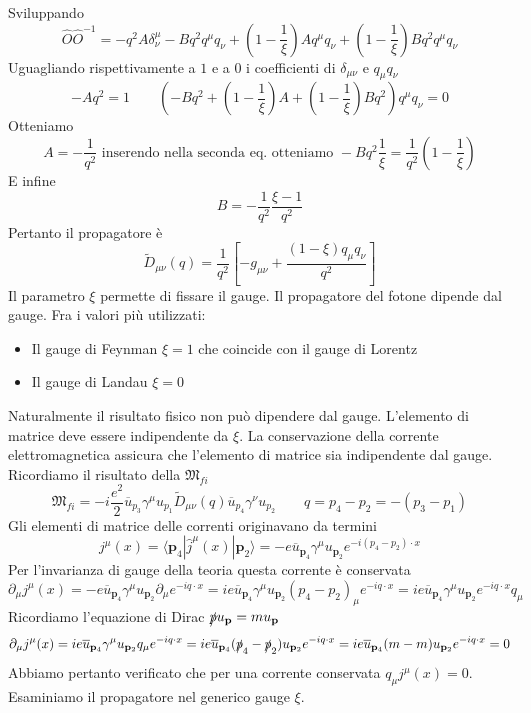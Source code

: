 Sviluppando
$$
\hat{O} \hat{O}^{-1} = -q^2 A \delta^\mu_\nu - B q^2 q^\mu q_\nu + \left( 1 - \frac{1}{\xi} \right) A q^\mu q_\nu + \left( 1 - \frac{1}{\xi} \right) B q^2 q^\mu q_\nu
$$
Uguagliando rispettivamente a $1$ e a $0$ i coefficienti di $\delta_{\mu\nu}$ e $q_\mu q_\nu$
$$
-A q^2 = 1 \qquad \left( -B q^2 + \left( 1 - \frac{1}{\xi} \right) A + \left( 1 - \frac{1}{\xi} \right) B q^2 \right) q^\mu q_\nu = 0
$$
Otteniamo
$$
A = -\frac{1}{q^2} \text{ inserendo nella seconda eq. otteniamo }-B q^2 \frac{1}{\xi} = \frac{1}{q^2} \left( 1 - \frac{1}{\xi} \right)
$$
E infine
$$
B = - \frac{1}{q^2} \frac{\xi - 1}{q^2}
$$
Pertanto il propagatore è
$$
\tilde{D}_{\mu\nu}(q) = \frac{1}{q^2} \left[ -g_{\mu\nu} + \frac{(1 - \xi) q_\mu q_\nu}{q^2} \right]
$$
Il parametro $\xi$ permette di fissare il gauge. Il propagatore del fotone dipende dal gauge. Fra i valori più utilizzati:
\begin{itemize}
    \item Il gauge di Feynman $\xi=1$ che coincide con il gauge di Lorentz
    \item Il gauge di Landau $\xi=0$
\end{itemize}
Naturalmente il risultato fisico non può dipendere dal gauge. L'elemento di matrice deve essere indipendente da $\xi$. La conservazione della corrente elettromagnetica assicura che l'elemento di matrice sia indipendente dal gauge. Ricordiamo il risultato della $\mathfrak{M}_{fi}$
$$
\mathfrak{M}_{fi} = -i \frac{e^2}{2} \overline{u}_{p_3} \gamma^\mu u_{p_1} \tilde{D}_{\mu\nu}(q) \overline{u}_{p_4} \gamma^\nu u_{p_2} \qquad q = p_4 - p_2 = -(p_3 - p_1)
$$
Gli elementi di matrice delle correnti originavano da termini
$$
j^\mu(x) = \langle \mathbf{p}_4 | \hat{j}^\mu(x) | \mathbf{p}_2 \rangle = -e \overline{u}_{\mathbf{p}_4} \gamma^\mu u_{\mathbf{p}_2} e^{-i(p_4-p_2) \cdot x}
$$
Per l'invarianza di gauge della teoria questa corrente è conservata
$$
\partial_\mu j^\mu(x) = -e \overline{u}_{\mathbf{p}_4} \gamma^\mu u_{\mathbf{p}_2} \partial_\mu e^{-iq \cdot x} = i e \overline{u}_{\mathbf{p}_4} \gamma^\mu u_{\mathbf{p}_2} (p_4 - p_2)_\mu e^{-iq \cdot x} = i e \overline{u}_{\mathbf{p}_4} \gamma^\mu u_{\mathbf{p}_2} e^{-iq \cdot x} q_\mu
$$
Ricordiamo l'equazione di Dirac $\slashed{p}u_\mathbf{p}=mu_\mathbf{p}$
$$
\partial_\mu j^\mu(x) = i e \overline{u}_{\mathbf{p}_4} \gamma^\mu u_{\mathbf{p}_2} q_\mu e^{-iq \cdot x} = i e \overline{u}_{\mathbf{p}_4} (\slashed{p}_4 - \slashed{p}_2) u_{\mathbf{p}_2} e^{-iq \cdot x} = i e \overline{u}_{\mathbf{p}_4} (m - m) u_{\mathbf{p}_2} e^{-iq \cdot x} = 0
$$
Abbiamo pertanto verificato che per una corrente conservata $q_\mu j^\mu (x)=0$. Esaminiamo il propagatore nel generico gauge $\xi$.
